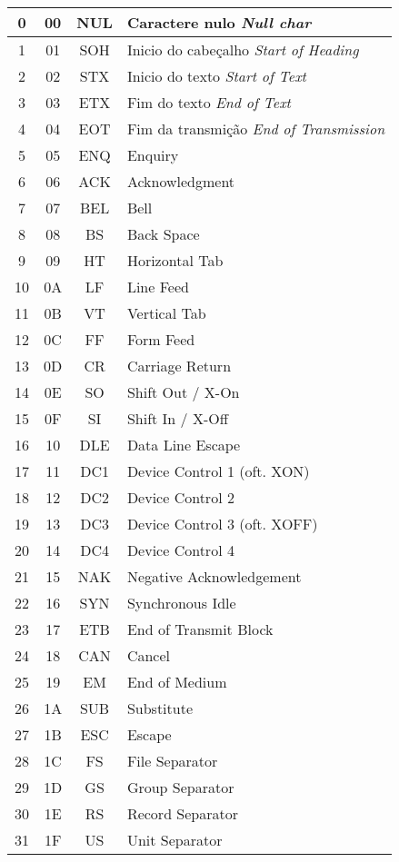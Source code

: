 {\begin{longtable}[c]{c c c l}
    0 & 00 & NUL & Caractere nulo \emph{Null char} \\ \hline
    1 & 01 & SOH & Inicio do cabeçalho \emph{Start of Heading} \\ \hline
    2 & 02 & STX & Inicio do texto \emph{Start of Text} \\ \hline
    3 & 03 & ETX & Fim do texto \emph{End of Text} \\ \hline
    4 & 04 & EOT & Fim da transmição \emph{End of Transmission} \\ \hline
    5 & 05 & ENQ & Enquiry \\ \hline
    6 & 06 & ACK & Acknowledgment \\ \hline
    7 & 07 & BEL & Bell \\ \hline
    8 & 08 & BS & Back Space \\ \hline
    9 & 09 & HT & Horizontal Tab \\ \hline
    10 & 0A & LF & Line Feed \\ \hline
    11 & 0B & VT & Vertical Tab \\ \hline
    12 & 0C & FF & Form Feed \\ \hline
    13 & 0D & CR & Carriage Return \\ \hline
    14 & 0E & SO & Shift Out / X-On \\ \hline
    15 & 0F & SI & Shift In / X-Off \\ \hline
    16 & 10 & DLE & Data Line Escape \\ \hline
    17 & 11 & DC1 & Device Control 1 (oft. XON) \\ \hline
    18 & 12 & DC2 & Device Control 2 \\ \hline
    19 & 13 & DC3 & Device Control 3 (oft. XOFF) \\ \hline
    20 & 14 & DC4 & Device Control 4 \\ \hline
    21 & 15 & NAK & Negative Acknowledgement \\ \hline
    22 & 16 & SYN & Synchronous Idle \\ \hline
    23 & 17 & ETB & End of Transmit Block \\ \hline
    24 & 18 & CAN & Cancel \\ \hline
    25 & 19 & EM & End of Medium \\ \hline
    26 & 1A & SUB & Substitute \\ \hline
    27 & 1B & ESC & Escape \\ \hline
    28 & 1C & FS & File Separator \\ \hline
    29 & 1D & GS & Group Separator \\ \hline
    30 & 1E & RS & Record Separator \\ \hline
    31 & 1F & US & Unit Separator \\ \hline


\end{longtable}}
